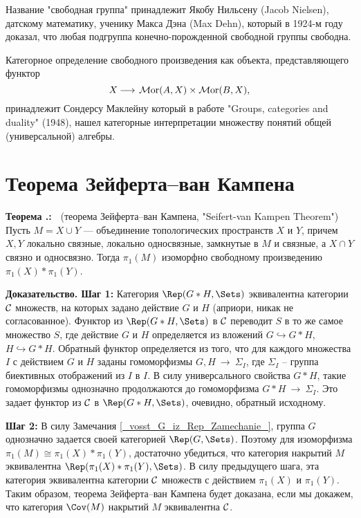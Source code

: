 \documentclass[12pt]{book}
\newcommand{\arrow}{{\:\longrightarrow\:}}
\newcommand{\Mor}{\operatorname{{\cal M}or}}
\newcommand{\cac}{{\cal C}}
\theoremstyle{upshape}
\theoremstyle{generic}
\theoremstyle{upshapenonumber}
\newcommand{\следствие}{%
     \refstepcounter{teorema}
     {\noindent\bf Следствие \thechapter.\arabic{teorema}:\ }}
\newcommand{\пример}{%
     \refstepcounter{teorema}
     {\noindent\bf Пример \thechapter.\arabic{teorema}:\ }}
\newcommand{\лемма}{%
     \refstepcounter{teorema}
     {\noindent\bf Лемма \thechapter.\arabic{teorema}:\ }}
\newcommand{\теорема}{%
     \refstepcounter{teorema}
     {\noindent\bf Теорема \thechapter.\arabic{teorema}:\ }}
\newcommand{\утверждение}{%
     \refstepcounter{teorema}
     {\noindent\bf Утверждение \thechapter.\arabic{teorema}:\ }}
\begin{document}
Название "свободная группа"
принадлежит Якобу Нильсену (Jacob Nielsen), датскому математику,
ученику Макса Дэна (Max Dehn),
который в 1924-м году 
доказал, что любая подгруппа конечно-порожденной
свободной группы свободна. 

Категорное определение свободного произведения
как объекта, представляющего функтор
\[ X\arrow \Mor(A,X) \times \Mor(B,X),\]
принадлежит Сондерсу Маклейну
который в работе "Groups, categories and duality"
(1948), нашел категорные интерпретации множеству
 понятий общей  (универсальной) алгебры.

\section{Теорема Зейферта--ван Кампена}

\теорема
(теорема Зейферта--ван Кампена, "Seifert-van Kampen Theorem")
Пусть $M=X\cup Y$ --- объединение топологических
пространств $X$ и $Y$, причем $X,Y$ локально 
связные, локально односвязные, замкнутые в $M$ и связные,
а $X \cap Y$ связно и односвязно.
Тогда $\pi_1(M)$ изоморфно свободному
произведению $\pi_1(X) * \pi_1(Y)$.

\hfill

\noindent
{\bf Доказательство. Шаг 1:}
Категория $\Rep(G*H, \Sets)$ эквивалентна категории $\cac$
множеств, на которых задано действие $G$ и $H$ (априори,
никак не согласованное). Функтор из $\Rep(G*H, \Sets)$
в $\cac$ переводит $S$ в то же самое множество $S$, где
действие $G$ и $H$ определяется из вложений $G \hookrightarrow G*H$,
$H \hookrightarrow G*H$. Обратный функтор определяется
из того, что для каждого множества $I$ с действием $G$ и $H$
заданы гомоморфизмы $G, H \arrow \Sigma_I$, где $\Sigma_I$ --
группа биективных отображений из $I$ в $I$. В силу универсального
свойства $G*H$, такие гомоморфизмы однозначно продолжаются до гомоморфизма
$G*H \arrow \Sigma_I$. Это задает функтор из $\cac$ в $\Rep(G*H, \Sets)$,
очевидно, обратный исходному.

\hfill

\noindent
{\bf Шаг 2:} В силу Замечания \ref{_vosst_G_iz_Rep_Zamechanie_},
группа $G$ однозначно задается своей категорией $\Rep(G, \Sets)$.
Поэтому для изоморфизма $\pi_1(M)\cong \pi_1(X) * \pi_1(Y)$,
достаточно убедиться, что категория накрытий $M$
эквивалентна $\Rep(\pi_1(X) * \pi_1(Y), \Sets)$.
В силу предыдущего шага, эта категория эквивалентна
категории $\cac$ множеств с действием $\pi_1(X)$ и $\pi_1(Y)$.
Таким образом, теорема Зейферта--ван Кампена будет доказана,
если мы докажем, что категория $\Cov(M)$ накрытий $M$ эквивалентна $\cac$.
\end{document}
